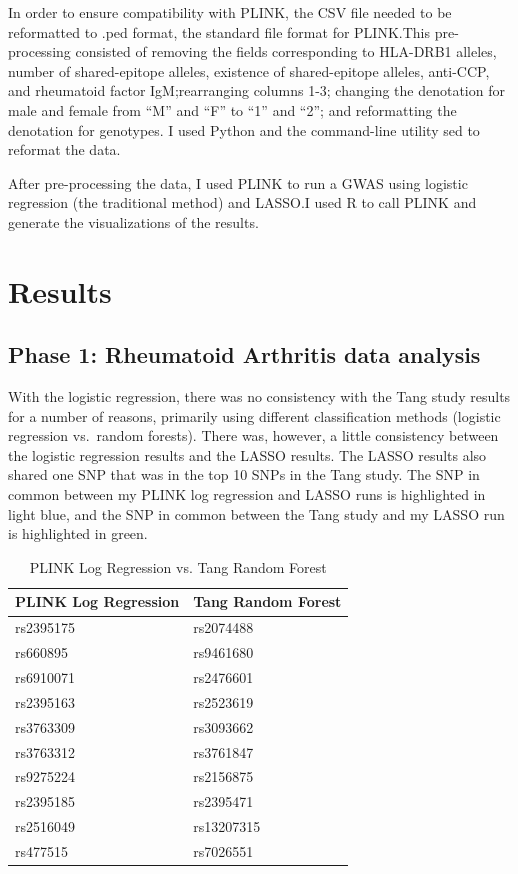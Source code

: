 \documentclass[12pt]{report}
\begin{document}
In order to ensure compatibility with PLINK, the CSV file needed to be
reformatted to .ped format, the standard file format for PLINK.\@ This
pre-processing consisted of removing the fields corresponding to HLA-DRB1
alleles, number of shared-epitope alleles, existence of shared-epitope alleles,
anti-CCP, and rheumatoid factor IgM;\@ rearranging columns 1-3; changing the
denotation for male and female from ``M'' and ``F'' to ``1'' and ``2''; and
reformatting the denotation for genotypes. I used Python and the command-line
utility sed to reformat the data.

After pre-processing the data, I used PLINK to run a GWAS using logistic
regression (the traditional method) and LASSO.\@ I used R\cite{RCoreTeam2016} to
call PLINK and generate the visualizations of the results.

\chapter{Results}
\section{Phase 1: Rheumatoid Arthritis data analysis}
With the logistic regression, there was no consistency with the Tang study
results for a number of reasons, primarily using different classification
methods (logistic regression vs.\ random forests). There was, however, a little
consistency between the logistic regression results and the LASSO results. The
LASSO results also shared one SNP that was in the top 10 SNPs in the Tang study.
The SNP in common between my PLINK log regression and LASSO runs is highlighted
in light blue, and the SNP in common between the Tang study and my LASSO run is
highlighted in green.

\begin{table}[!ht]
\centering
\caption{PLINK Log Regression vs. Tang Random Forest}
\label{Table 1}
\begin{tabular}{@{}ll@{}}
\toprule
PLINK Log Regression & Tang Random Forest \\ \midrule
\cellcolor{PaleTurquoise2}rs2395175            & rs2074488          \\
rs660895             & rs9461680          \\
rs6910071            & \cellcolor{PaleGreen2}rs2476601          \\
rs2395163            & rs2523619          \\
rs3763309            & rs3093662          \\
rs3763312            & rs3761847          \\
rs9275224            & rs2156875          \\
rs2395185            & rs2395471          \\
rs2516049            & rs13207315         \\
rs477515             & rs7026551          \\ \bottomrule
\end{tabular}
\end{table}
\end{document}
